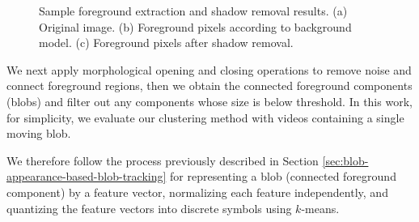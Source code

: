 \begin{figure}
  \centering
  \hspace{0.1in}
  \hspace{0.1in}
  \caption[Sample foreground extraction and shadow removal
    results.]{\small Sample foreground extraction and shadow removal
    results.  (a) Original image. (b) Foreground pixels according to
    background model. (c) Foreground pixels after shadow removal.}
  \label{fig:shadow-result}
\end{figure}

We next apply morphological opening and closing operations to remove
noise and connect foreground regions, then we obtain the connected
foreground components (blobs) and filter out any components whose size
is below threshold. In this work, for simplicity, we evaluate our
clustering method with videos containing a single moving blob.

We therefore follow the process previously described in
Section \ref{sec:blob-appearance-based-blob-tracking} for representing
a blob (connected foreground component) by a feature vector,
normalizing each feature independently, and quantizing the feature
vectors into discrete symbols using $k$-means.

